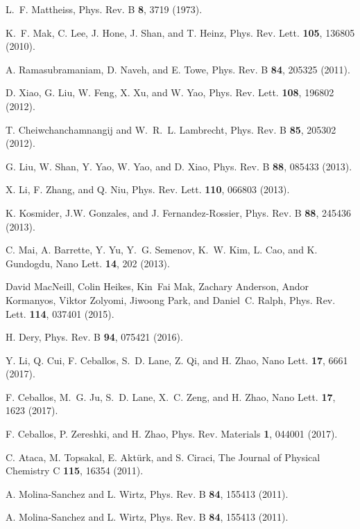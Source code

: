 \documentclass[aps,prb,superscriptaddress,letterpaper,amsmath,amssymb,twocolumn,preprintnumbers]{revtex4}
\begin{document}
\begin{thebibliography}{10}
L.~F. Mattheiss, Phys. Rev. B {\bf 8},  3719  (1973).

K.~F. Mak, C. Lee, J. Hone, J. Shan, and T. Heinz, Phys. Rev. Lett. {\bf 105},
  136805   (2010).

A. Ramasubramaniam, D. Naveh, and E. Towe, Phys. Rev. B {\bf 84},  205325
  (2011).

D. Xiao, G. Liu, W. Feng, X. Xu, and W. Yao, Phys. Rev. Lett. {\bf 108},
  196802   (2012).

T. Cheiwchanchamnangij and W.~R.~L. Lambrecht, Phys. Rev. B {\bf 85},  205302
  (2012).

G. Liu, W. Shan, Y. Yao, W. Yao, and D. Xiao, Phys. Rev. B {\bf 88},  085433
  (2013).

X. Li, F. Zhang, and Q. Niu, Phys. Rev. Lett. {\bf 110},  066803   (2013).

K. Kosmider, J.W. Gonzales, and J. Fernandez-Rossier, Phys. Rev. B {\bf 88},
  245436   (2013).

C. Mai, A. Barrette, Y. Yu, Y.~G. Semenov, K.~W. Kim, L. Cao, and K. Gundogdu,
  Nano Lett. {\bf 14},  202  (2013).

David MacNeill, Colin Heikes, Kin~Fai Mak, Zachary Anderson, Andor Kormanyos,
  Viktor Zolyomi, Jiwoong Park, and Daniel~C. Ralph, Phys. Rev. Lett. {\bf
  114},  037401   (2015).

H. Dery, Phys. Rev. B {\bf 94},  075421   (2016).

Y. Li, Q. Cui, F. Ceballos, S.~D. Lane, Z. Qi, and H. Zhao, Nano Lett. {\bf
  17},  6661  (2017).

F. Ceballos, M.~G. Ju, S.~D. Lane, X.~C. Zeng, and H. Zhao, Nano Lett. {\bf
  17},  1623  (2017).

F. Ceballos, P. Zereshki, and H. Zhao, Phys. Rev. Materials {\bf 1},  044001
  (2017).

C. Ataca, M. Topsakal, E. Akt{\"{u}}rk, and S. Ciraci, The Journal of Physical
  Chemistry C {\bf 115},  16354   (2011).

A. Molina-Sanchez and L. Wirtz, Phys. Rev. B {\bf 84},  155413   (2011).

A. Molina-Sanchez and L. Wirtz, Phys. Rev. B {\bf 84},  155413   (2011).


\end{thebibliography}
\end{document}
